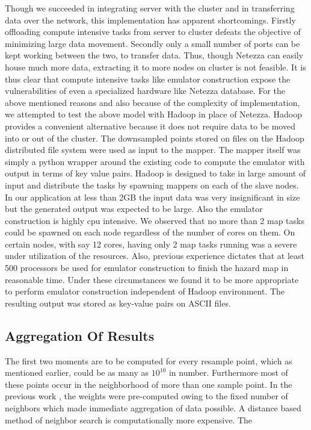 \documentclass{acm_proc_article-sp}
\begin{document}
Though we succeeded in integrating server with the cluster and in transferring data over the network, this implementation has apparent
shortcomings. Firstly offloading compute intensive tasks from server to cluster defeats the objective of minimizing large data movement.
Secondly only a small number of ports can be kept working between the two, to transfer data. Thus, though Netezza can easily house much
more data, extracting it to more nodes on cluster is not feasible. It is thus clear that compute intensive tasks like emulator construction
expose the vulnerabilities of even a specialized hardware like Netezza database. For the above mentioned reasons and also because of the 
complexity of implementation,  we attempted to test the above model with Hadoop in place of Netezza. Hadoop provides a convenient alternative
because it does not require data to be moved into or out of the cluster. The downsampled points stored on files on the Hadoop distributed
file system were used as input to the mapper. The mapper itself was simply a python wrapper around the existing code to compute the emulator
with output in terms of key value pairs. 
Hadoop is designed to take in large amount of input and distribute the tasks by spawning mappers on each of the slave nodes. In our application
at less than 2GB the input data was very insignificant in size but the generated output was expected to be large. Also the emulator construction
is highly cpu intensive. 
We observed that no more than 2 map tasks could be spawned on each node regardless of the number of cores on them.
On certain nodes, with say 12 cores, having only 2 map tasks running was a severe under utilization of the resources.
Also, previous experience dictates that at least 500 processors be used for emulator construction to finish the 
hazard map in reasonable time. Under these circumstances we found it to be more appropriate to perform emulator construction independent
of Hadoop environment. The resulting output was stored as key-value pairs on ASCII files. 





\subsection{Aggregation Of Results}
The first two moments are to be computed for every resample point, which as mentioned 
earlier, could be as many as $10^{10}$ in number. Furthermore most of these points occur in the neighborhood of more than one sample point. In
the previous work \cite{keith}, the weights were pre-computed owing to the fixed number of neighbors which made immediate aggregation of data
possible. A distance based method of neighbor search is computationally more expensive. The
\end{document}
